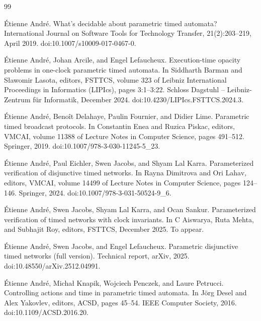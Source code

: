 \begin{thebibliography}{99}
\par\noindent    Étienne André.  What’s decidable about parametric timed automata?  International Journal on Software Tools for Technology Transfer, 21(2):203--219, April 2019.  doi:10.1007/s10009-017-0467-0.  

\par\noindent    Étienne André, Johan Arcile, and Engel Lefaucheux.  Execution-time opacity problems in one-clock parametric timed automata.  In Siddharth Barman and Sławomir Lasota, editors, FSTTCS, volume 323 of Leibniz International Proceedings in Informatics (LIPIcs), pages 3:1--3:22. Schloss Dagstuhl -- Leibniz-Zentrum für Informatik, December 2024.  doi:10.4230/LIPIcs.FSTTCS.2024.3.  

\par\noindent    Étienne André, Benoît Delahaye, Paulin Fournier, and Didier Lime.  Parametric timed broadcast protocols.  In Constantin Enea and Ruzica Piskac, editors, VMCAI, volume 11388 of Lecture Notes in Computer Science, pages 491--512. Springer, 2019.  doi:10.1007/978-3-030-11245-5\_23.  

\par\noindent    Étienne André, Paul Eichler, Swen Jacobs, and Shyam Lal Karra.  Parameterized verification of disjunctive timed networks.  In Rayna Dimitrova and Ori Lahav, editors, VMCAI, volume 14499 of Lecture Notes in Computer Science, pages 124--146. Springer, 2024.  doi:10.1007/978-3-031-50524-9\_6.  

\par\noindent    Étienne André, Swen Jacobs, Shyam Lal Karra, and Ocan Sankur.  Parameterized verification of timed networks with clock invariants.  In C Aiswarya, Ruta Mehta, and Subhajit Roy, editors, FSTTCS, December 2025.  To appear.  

\par\noindent    Étienne André, Swen Jacobs, and Engel Lefaucheux.  Parametric disjunctive timed networks (full version).  Technical report, arXiv, 2025.  doi:10.48550/arXiv.2512.04991.  

\par\noindent    Étienne André, Michał Knapik, Wojciech Penczek, and Laure Petrucci.  Controlling actions and time in parametric timed automata.  In Jörg Desel and Alex Yakovlev, editors, ACSD, pages 45--54. IEEE Computer Society, 2016.  doi:10.1109/ACSD.2016.20.  


\end{thebibliography}
